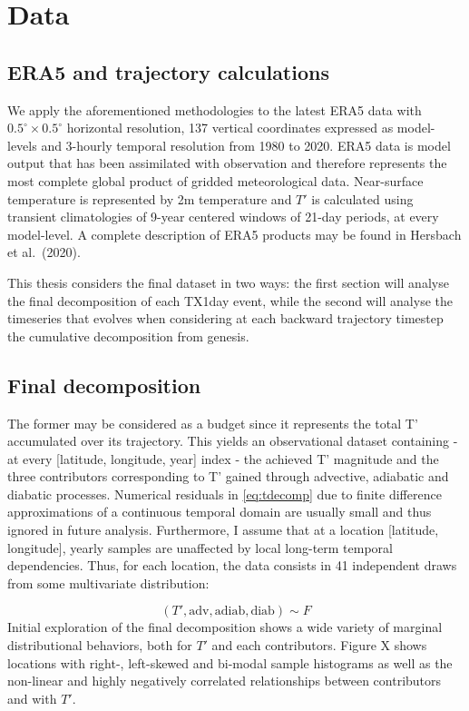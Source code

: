 \documentclass[11pt,a4paper,twoside,openright]{report}
\theoremstyle{definition}
\begin{document}
\chapter{Data}\label{data}

\section{ERA5 and trajectory calculations}\label{era5-and-trajectory-calculations}

We apply the aforementioned methodologies to the latest ERA5 data with \(0.5^{\circ} \times 0.5^{\circ}\) horizontal resolution, 137 vertical coordinates expressed as model-levels and 3-hourly temporal resolution from 1980 to 2020. ERA5 data is model output that has been assimilated with observation and therefore represents the most complete global product of gridded meteorological data. Near-surface temperature is represented by 2m temperature and \(T'\) is calculated using transient climatologies of 9-year centered windows of 21-day periods, at every model-level. A complete description of ERA5 products may be found in Hersbach et al.~(2020).

This thesis considers the final dataset in two ways: the first section will analyse the final decomposition of each TX1day event, while the second will analyse the timeseries that evolves when considering at each backward trajectory timestep the cumulative decomposition from genesis.

\section{Final decomposition}\label{final-decomposition}

The former may be considered as a budget since it represents the total T' accumulated over its trajectory. This yields an observational dataset containing - at every {[}latitude, longitude, year{]} index - the achieved T' magnitude and the three contributors corresponding to T' gained through advective, adiabatic and diabatic processes. Numerical residuals in \eqref{eq:tdecomp} due to finite difference approximations of a continuous temporal domain are usually small and thus ignored in future analysis. Furthermore, I assume that at a location {[}latitude, longitude{]}, yearly samples are unaffected by local long-term temporal dependencies. Thus, for each location, the data consists in 41 independent draws from some multivariate distribution:

\[(T',\text{adv},\text{adiab},\text{diab}) \sim F \]
Initial exploration of the final decomposition shows a wide variety of marginal distributional behaviors, both for \(T'\) and each contributors. Figure X shows locations with right-, left-skewed and bi-modal sample histograms as well as the non-linear and highly negatively correlated relationships between contributors and with \(T'\).
\end{document}
